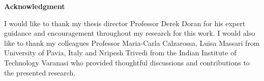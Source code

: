 \newpage
\thispagestyle{empty}

\begin {center}
{\normalfont
\Large\bfseries Acknowledgment}
\end {center}



I would like to thank my thesis director Professor Derek Doran for his expert guidance and encouragement throughout my research for this work. I would also like to thank my colleagues Professor Maria-Carla Calzarossa, Luisa Massari from University of Pavia, Italy and Nripesh Trivedi from the Indian Institute of Technology Varanasi who provided thoughtful discussions and contributions to the presented research. 


























\restoregeometry

